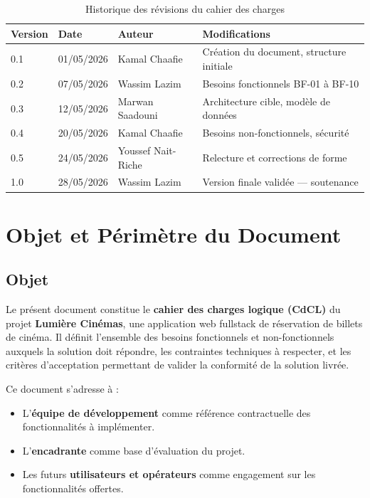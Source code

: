 \documentclass[12pt,a4paper,openany]{report}
\begin{document}
\begin{table}[H]
\centering
\begin{tabular}{llll}
\toprule
\textbf{Version} & \textbf{Date} & \textbf{Auteur} & \textbf{Modifications} \\
\midrule
0.1 & 01/05/2026 & Kamal Chaafie  & Création du document, structure initiale \\
0.2 & 07/05/2026 & Wassim Lazim   & Besoins fonctionnels BF-01 à BF-10 \\
0.3 & 12/05/2026 & Marwan Saadouni& Architecture cible, modèle de données \\
0.4 & 20/05/2026 & Kamal Chaafie  & Besoins non-fonctionnels, sécurité \\
0.5 & 24/05/2026 & Youssef Nait-Riche & Relecture et corrections de forme \\
1.0 & 28/05/2026 & Wassim Lazim   & Version finale validée — soutenance \\
\bottomrule
\end{tabular}
\caption{Historique des révisions du cahier des charges}
\end{table}

\newpage

\chapter{Objet et Périmètre du Document}

\section{Objet}

Le présent document constitue le \textbf{cahier des charges logique (CdCL)} du projet \textbf{Lumière Cinémas}, une application web fullstack de réservation de billets de cinéma. Il définit l'ensemble des besoins fonctionnels et non-fonctionnels auxquels la solution doit répondre, les contraintes techniques à respecter, et les critères d'acceptation permettant de valider la conformité de la solution livrée.

Ce document s'adresse à :
\begin{itemize}
  \item L'\textbf{équipe de développement} comme référence contractuelle des fonctionnalités à implémenter.
  \item L'\textbf{encadrante} comme base d'évaluation du projet.
  \item Les futurs \textbf{utilisateurs et opérateurs} comme engagement sur les fonctionnalités offertes.
\end{itemize}
\end{document}
